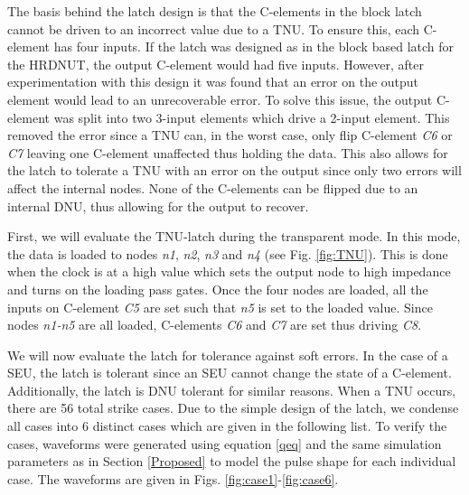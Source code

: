 The basis behind the latch design is that the C-elements in the block latch cannot be driven to an incorrect value due to a TNU. To ensure this, each C-element has four inputs. If the latch was designed as in the block based latch for the HRDNUT, the output C-element would had five inputs. However, after experimentation with this design it was found that an error on the output element would lead to an unrecoverable error. To solve this issue, the output C-element was split into two 3-input elements which drive a 2-input element. This removed the error since a TNU can, in the worst case, only flip C-element \textit{C6} or \textit{C7} leaving one C-element unaffected thus holding the data. This also allows for the latch to tolerate a TNU with an error on the output since only two errors will affect the internal nodes. None of the C-elements can be flipped due to an internal DNU, thus allowing for the output to recover.

First, we will evaluate the TNU-latch during the transparent mode. In this mode, the data is loaded to nodes \textit{n1}, \textit{n2}, \textit{n3} and \textit{n4} (see Fig. \ref{fig:TNU}). This is done when the clock is at a high value which sets the output node to high impedance and turns on the loading pass gates. Once the four nodes are loaded, all the inputs on C-element \textit{C5} are set such that \textit{n5} is set to the loaded value. Since nodes \textit{n1-n5} are all loaded, C-elements \textit{C6} and \textit{C7} are set thus driving \textit{C8}.

We will now evaluate the latch for tolerance against soft errors. In the case of a SEU, the latch is tolerant since an SEU cannot change the state of a C-element. Additionally, the latch is DNU tolerant for similar reasons. When a TNU occurs, there are 56 total strike cases. Due to the simple design of the latch, we condense all cases into 6 distinct cases which are given in the following list. To verify the cases, waveforms were generated using equation \ref{qeq} and the same simulation parameters as in Section \ref{Proposed} to model the pulse shape for each individual case. The waveforms are given in Figs. \ref{fig:case1}-\ref{fig:case6}.

